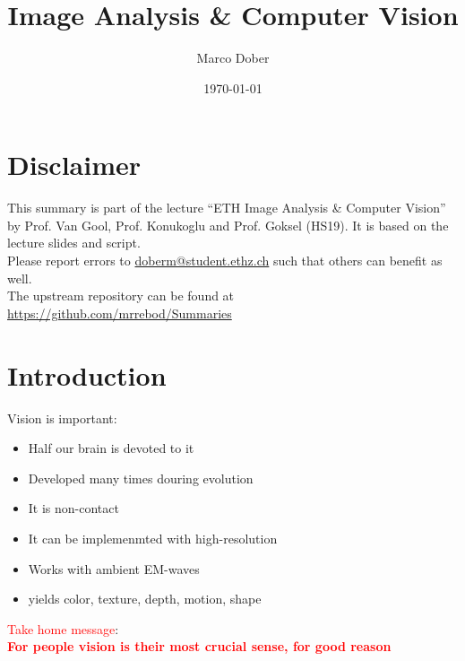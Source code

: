 \documentclass[a4paper, fontsize=8pt, landscape, DIV=1]{scrartcl}
\title{Image Analysis \& Computer Vision}
\author{Marco Dober}
\date{\today}
\begin{document}
	\setcounter{secnumdepth}{3} %
	\begin{multicols*}{4}
		\section*{Disclaimer}
		This summary is part of the lecture ``ETH Image Analysis \& Computer Vision'' by Prof. Van Gool, Prof. Konukoglu and Prof. Goksel  (HS19). It is based on the lecture slides and script. \\[6pt]
		Please report errors to \href{mailto:doberm@student.ethz.ch}{doberm@student.ethz.ch} such that others can benefit as well.\\[6pt]	
		The upstream repository can be found at \href{https://github.com/mrrebod/Summaries}{https://github.com/mrrebod/Summaries}
		\vfill\null
		\pagebreak
		
		\maketitle 
		\thispagestyle{fancy}
		
		\section{Introduction}
		Vision is important:
		\begin{itemize}[noitemsep, label={$\blacktriangleright$}]
			\item Half our brain is devoted to it
			\item Developed many times douring evolution
			\item It is non-contact
			\item It can be implemenmted with high-resolution
			\item Works with ambient EM-waves
			\item yields color, texture, depth, motion, shape
		\end{itemize}
		\textcolor{red}{Take home message}:\\
		\textbf{\textcolor{red}{For people vision is their most crucial sense, for good reason}}

\end{multicols*}
\end{document}
